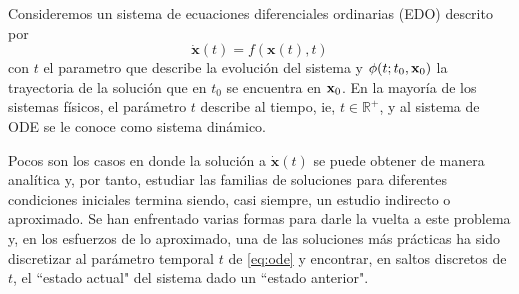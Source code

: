 Consideremos un sistema de ecuaciones diferenciales ordinarias (EDO) descrito por 
\begin{equation}
\dot{\mathbf{x}}(t) = f(\mathbf{x}(t),t)
\label{eq:ode}
\end{equation}
con $t$ el parametro que describe la evolución del sistema y $\phi(t;t_0,\mathbf{x}_0)$ la trayectoria de la solución que en $t_0$ se encuentra en $\mathbf{x}_0$. En la mayoría de los sistemas físicos, el parámetro $t$ describe al tiempo, ie, $t \in \mathbb{R}^+$, y al sistema de ODE se le conoce como sistema dinámico.

Pocos son los casos en donde la solución a $\dot{\mathbf{x}}(t)$ se puede obtener de manera analítica y, por tanto, estudiar las familias de soluciones para diferentes condiciones iniciales termina siendo, casi siempre, un estudio indirecto o aproximado. Se han enfrentado varias formas para darle la vuelta a este problema y, en los esfuerzos de lo aproximado, una de las soluciones más prácticas ha sido discretizar al parámetro temporal $t$ de \ref{eq:ode} y encontrar, en saltos discretos de $t$, el ``estado actual" del sistema dado un ``estado anterior".

